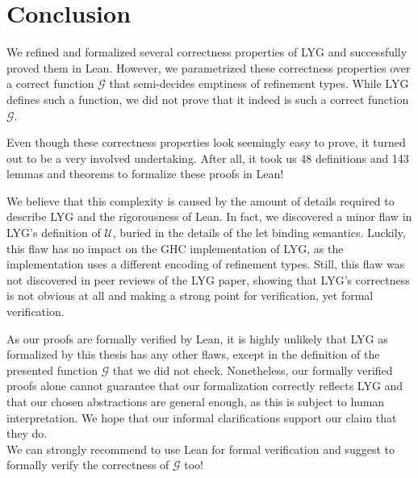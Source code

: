 \chapter{Conclusion}\label{sec:conclusion}

We refined and formalized several correctness properties of LYG and successfully proved them in Lean.
However, we parametrized these correctness properties over a correct function $\mathcal{G}$ that semi-decides emptiness of refinement types.
While LYG defines such a function, we did not prove that it indeed is such a correct function $\mathcal{G}$.

Even though these correctness properties look seemingly easy to prove, it turned out to be a very involved undertaking.
After all, it took us 48 definitions and 143 lemmas and theorems to formalize these proofs in Lean!

We believe that this complexity is caused by the amount of details required to describe LYG and the rigorousness of Lean.
In fact, we discovered a minor flaw in LYG's definition of $\mathcal{U}$, buried in the details of the let binding semantics.
Luckily, this flaw has no impact on the GHC implementation of LYG, as the implementation uses a different encoding of refinement types.
Still, this flaw was not discovered in peer reviews of the LYG paper,
showing that LYG's correctness is not obvious at all and making a strong point for verification, yet formal verification.

As our proofs are formally verified by Lean, it is highly unlikely that LYG as formalized by this thesis has any other flaws,
except in the definition of the presented function $\mathcal{G}$ that we did not check.
Nonetheless, our formally verified proofs alone cannot guarantee that our formalization correctly reflects LYG and that our chosen abstractions are general enough, as this is subject to human interpretation. We hope that our informal clarifications support our claim that they do.\\

We can strongly recommend to use Lean for formal verification and suggest to formally verify the correctness of $\mathcal{G}$ too!